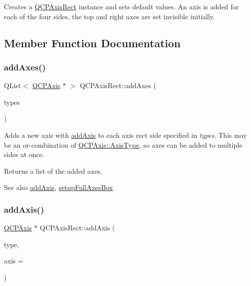 Creates a \hyperlink{classQCPAxisRect}{Q\+C\+P\+Axis\+Rect} instance and sets default values. An axis is added for each of the four sides, the top and right axes are set invisible initially. 

\subsection{Member Function Documentation}
\mbox{\label{classQCPAxisRect_a792e1f3d9cb1591fca135bb0de9b81fc}} 
\subsubsection{\texorpdfstring{add\+Axes()}{addAxes()}}
{\footnotesize\ttfamily Q\+List$<$ \hyperlink{classQCPAxis}{Q\+C\+P\+Axis} $\ast$ $>$ Q\+C\+P\+Axis\+Rect\+::add\+Axes (\begin{DoxyParamCaption}\item[{Q\+C\+P\+Axis\+::\+Axis\+Types}]{types }\end{DoxyParamCaption})}

Adds a new axis with \hyperlink{classQCPAxisRect_a2dc336092ccc57d44a46194c8a23e4f4}{add\+Axis} to each axis rect side specified in {\itshape types}. This may be an {\ttfamily or}-\/combination of \hyperlink{classQCPAxis_ae2bcc1728b382f10f064612b368bc18a}{Q\+C\+P\+Axis\+::\+Axis\+Type}, so axes can be added to multiple sides at once.

Returns a list of the added axes.

\begin{DoxySeeAlso}{See also}
\hyperlink{classQCPAxisRect_a2dc336092ccc57d44a46194c8a23e4f4}{add\+Axis}, \hyperlink{classQCPAxisRect_a5fa906175447b14206954f77fc7f1ef4}{setup\+Full\+Axes\+Box} 
\end{DoxySeeAlso}
\mbox{\label{classQCPAxisRect_a2dc336092ccc57d44a46194c8a23e4f4}} 
\subsubsection{\texorpdfstring{add\+Axis()}{addAxis()}}
{\footnotesize\ttfamily \hyperlink{classQCPAxis}{Q\+C\+P\+Axis} $\ast$ Q\+C\+P\+Axis\+Rect\+::add\+Axis (\begin{DoxyParamCaption}\item[{\hyperlink{classQCPAxis_ae2bcc1728b382f10f064612b368bc18a}{Q\+C\+P\+Axis\+::\+Axis\+Type}}]{type,  }\item[{\hyperlink{classQCPAxis}{Q\+C\+P\+Axis} $\ast$}]{axis = {} }\end{DoxyParamCaption})}

